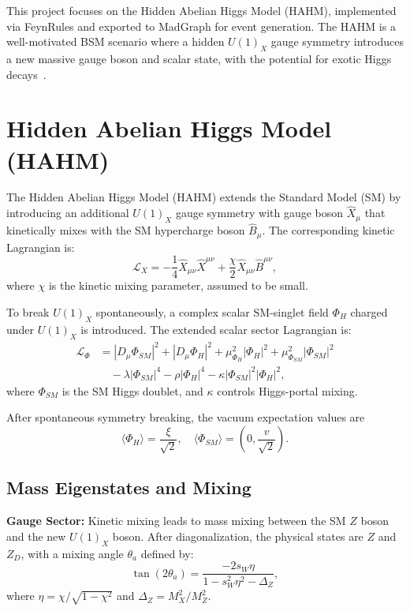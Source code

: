 \documentclass{CUP-JNL-DTM}%
\theoremstyle{definition}
\numberwithin{equation}{section}
\begin{document}
This project focuses on the Hidden Abelian Higgs Model (HAHM), implemented via FeynRules and exported to MadGraph for event generation. The HAHM is a well-motivated BSM scenario where a hidden $U(1)_X$ gauge symmetry introduces a new massive gauge boson and scalar state, with the potential for exotic Higgs decays~\cite{Curtin:2013fra,Curtin:2014cca}.




\section{Hidden Abelian Higgs Model (HAHM)}

The Hidden Abelian Higgs Model (HAHM) extends the Standard Model (SM) by introducing an additional $U(1)_X$ gauge symmetry with gauge boson $\hat{X}_\mu$ that kinetically mixes with the SM hypercharge boson $\hat{B}_\mu$. The corresponding kinetic Lagrangian is:
\begin{equation}
\mathcal{L}_X = -\frac{1}{4} \hat{X}_{\mu\nu} \hat{X}^{\mu\nu} + \frac{\chi}{2} \hat{X}_{\mu\nu} \hat{B}^{\mu\nu},
\end{equation}
where $\chi$ is the kinetic mixing parameter, assumed to be small.

To break $U(1)_X$ spontaneously, a complex scalar SM-singlet field $\Phi_H$ charged under $U(1)_X$ is introduced. The extended scalar sector Lagrangian is:
\begin{equation}
\begin{aligned}
\mathcal{L}_\Phi &= |D_\mu \Phi_{SM}|^2 + |D_\mu \Phi_H|^2 + \mu^2_{\Phi_H} |\Phi_H|^2 + \mu^2_{\Phi_{SM}} |\Phi_{SM}|^2 \\
&\quad - \lambda |\Phi_{SM}|^4 - \rho |\Phi_H|^4 - \kappa |\Phi_{SM}|^2 |\Phi_H|^2,
\end{aligned}
\end{equation}
where $\Phi_{SM}$ is the SM Higgs doublet, and $\kappa$ controls Higgs-portal mixing.

After spontaneous symmetry breaking, the vacuum expectation values are
\[
\langle \Phi_H \rangle = \frac{\xi}{\sqrt{2}}, \quad \langle \Phi_{SM} \rangle = \left(0, \frac{v}{\sqrt{2}}\right).
\]

\subsection{Mass Eigenstates and Mixing}

\textbf{Gauge Sector:} Kinetic mixing leads to mass mixing between the SM $Z$ boson and the new $U(1)_X$ boson. After diagonalization, the physical states are $Z$ and $Z_D$, with a mixing angle $\theta_a$ defined by:
\begin{equation}
\tan(2\theta_a) = \frac{-2 s_W \eta}{1 - s_W^2 \eta^2 - \Delta_Z},
\end{equation}
where $\eta = \chi / \sqrt{1 - \chi^2}$ and $\Delta_Z = M_X^2 / M_Z^2$.
\end{document}
